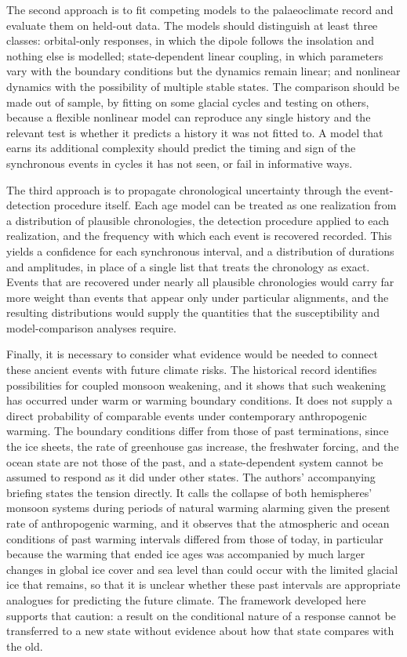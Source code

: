 \documentclass[11pt]{article}
\theoremstyle{definition}
\begin{document}
The second approach is to fit competing models to the palaeoclimate record and evaluate them on held-out data. The models should distinguish at least three classes: orbital-only responses, in which the dipole follows the insolation and nothing else is modelled; state-dependent linear coupling, in which parameters vary with the boundary conditions but the dynamics remain linear; and nonlinear dynamics with the possibility of multiple stable states. The comparison should be made out of sample, by fitting on some glacial cycles and testing on others, because a flexible nonlinear model can reproduce any single history and the relevant test is whether it predicts a history it was not fitted to. A model that earns its additional complexity should predict the timing and sign of the synchronous events in cycles it has not seen, or fail in informative ways.

The third approach is to propagate chronological uncertainty through the event-detection procedure itself. Each age model can be treated as one realization from a distribution of plausible chronologies, the detection procedure applied to each realization, and the frequency with which each event is recovered recorded. This yields a confidence for each synchronous interval, and a distribution of durations and amplitudes, in place of a single list that treats the chronology as exact. Events that are recovered under nearly all plausible chronologies would carry far more weight than events that appear only under particular alignments, and the resulting distributions would supply the quantities that the susceptibility and model-comparison analyses require.

Finally, it is necessary to consider what evidence would be needed to connect these ancient events with future climate risks. The historical record identifies possibilities for coupled monsoon weakening, and it shows that such weakening has occurred under warm or warming boundary conditions. It does not supply a direct probability of comparable events under contemporary anthropogenic warming. The boundary conditions differ from those of past terminations, since the ice sheets, the rate of greenhouse gas increase, the freshwater forcing, and the ocean state are not those of the past, and a state-dependent system cannot be assumed to respond as it did under other states. The authors' accompanying briefing states the tension directly. It calls the collapse of both hemispheres' monsoon systems during periods of natural warming alarming given the present rate of anthropogenic warming, and it observes that the atmospheric and ocean conditions of past warming intervals differed from those of today, in particular because the warming that ended ice ages was accompanied by much larger changes in global ice cover and sea level than could occur with the limited glacial ice that remains, so that it is unclear whether these past intervals are appropriate analogues for predicting the future climate. The framework developed here supports that caution: a result on the conditional nature of a response cannot be transferred to a new state without evidence about how that state compares with the old.
\end{document}
